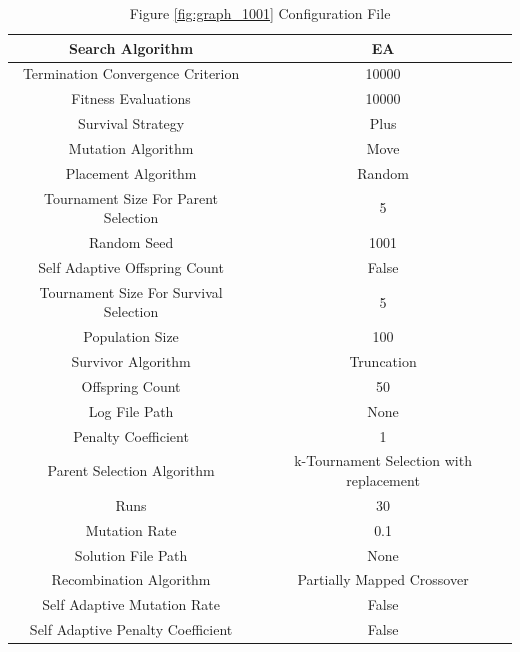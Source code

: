 \documentclass{standalone}
\begin{document}
\begin{table}[!htb]
	\centering
	\caption{Figure \ref{fig:graph_1001} Configuration File}
	\label{tab:graph_1001}
	\begin{tabular}{| c | c |}
		\hline
		Search Algorithm		& EA		 \\
		\hline
		Termination Convergence Criterion		& 10000		 \\
		\hline
		Fitness Evaluations		& 10000		 \\
		\hline
		Survival Strategy		& Plus		 \\
		\hline
		Mutation Algorithm		& Move		 \\
		\hline
		Placement Algorithm		& Random		 \\
		\hline
		Tournament Size For Parent Selection		& 5		 \\
		\hline
		Random Seed		& 1001		 \\
		\hline
		Self Adaptive Offspring Count		& False		 \\
		\hline
		Tournament Size For Survival Selection		& 5		 \\
		\hline
		Population Size		& 100		 \\
		\hline
		Survivor Algorithm		& Truncation		 \\
		\hline
		Offspring Count		& 50		 \\
		\hline
		Log File Path		& None		 \\
		\hline
		Penalty Coefficient		& 1		 \\
		\hline
		Parent Selection Algorithm		& k-Tournament Selection with replacement		 \\
		\hline
		Runs		& 30		 \\
		\hline
		Mutation Rate		& 0.1		 \\
		\hline
		Solution File Path		& None		 \\
		\hline
		Recombination Algorithm		& Partially Mapped Crossover		 \\
		\hline
		Self Adaptive Mutation Rate		& False		 \\
		\hline
		Self Adaptive Penalty Coefficient		& False		 \\
		\hline
	\end{tabular}
\end{table}
\end{document}
